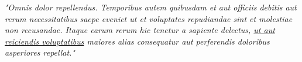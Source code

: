 \vspace{0.75cm}

\emph{"Omnis dolor repellendus. Temporibus autem quibusdam et aut officiis debitis aut rerum necessitatibus saepe eveniet ut et voluptates repudiandae sint et molestiae non recusandae. Itaque earum rerum hic tenetur a sapiente delectus, \underline{ut aut reiciendis voluptatibus} maiores alias consequatur aut perferendis doloribus asperiores repellat."}